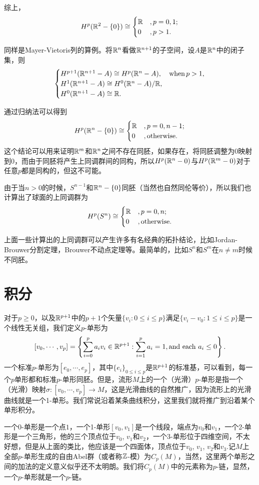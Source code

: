 综上，\[H^{p}(\mathbb{R}^2-\{0\})\cong
\begin{cases}
\mathbb{R}&,p=0,1;\\
0&,p>1.
\end{cases}\]

\para  同样是Mayer-Vietoris列的算例。将$\mathbb{R}^n$看做$\mathbb{R}^{n+1}$的子空间，设$A$是$\mathbb{R}^n$中的闭子集，则
\[
\begin{cases}
H^{p+1}(\mathbb{R}^{n+1}-A)\cong H^p(\mathbb{R}^n-A),&\text{when}\,p>1,\\
H^{1}(\mathbb{R}^{n+1}-A)\cong H^0(\mathbb{R}^n-A)/\mathbb{R},&\\
H^{0}(\mathbb{R}^{n+1}-A)\cong \mathbb{R}.&
\end{cases}
\]

通过归纳法可以得到
\[H^{p}(\mathbb{R}^n-\{0\})\cong
\begin{cases}
\mathbb{R}&,p=0,n-1;\\
0&,\text{otherwise}.
\end{cases}\]
这个结论可以用来证明$\mathbb{R}^m$和$\mathbb{R}^n$之间不存在同胚，如果存在，将同胚调整为$0$映射到$0$，而由于同胚将产生上同调群间的同构，所以$H^{p}(\mathbb{R}^n-{0})$与$H^{p}(\mathbb{R}^m-{0})$对于任意$p$都是同构的，但这不可能。

由于当$n>0$的时候，$S^{n-1}$和$\mathbb{R}^n-\{0\}$同胚（当然也自然同伦等价），所以我们也计算出了球面的上同调群为
\[H^{p}(S^{n})\cong
\begin{cases}
\mathbb{R}&,p=0,n;\\
0&,\text{otherwise}.
\end{cases}\]

上面一些计算出的上同调群可以产生许多有名经典的拓扑结论，比如Jordan-Brouwer分割定理，Brouwer不动点定理等。最简单的，比如$S^n$和$S^m$在$n\neq m$时候不同胚。

\section{积分}

\para 对于$p\geq 0$，以及$\mathbb{R}^{p+1}$中的$p+1$个矢量$\{v_i:0\leq i\leq p\}$满足$\{v_i-v_0:1\leq i\leq p\}$是一个线性无关组，我们定义$p$-单形为
\[
	[v_0,\cdots,v_p]=\left\{\sum_{i=0}^p a_iv_i\in \mathbb{R}^{p+1}:\sum_{i=1}^p a_i=1,\text{and each } a_i\leq 0\right\}.
\]
一个标准$p$-单形为$[e_0,\cdots,e_p]$，其中$\{e_i\}_{0\leq i \leq p}$是$\mathbb{R}^{p+1}$的标准基，可以看到，每一个$p$单形都和标准$p$-单形同胚。但是，流形$M$上的一个（光滑）$p$-单形是指一个（光滑）映射$\sigma:[v_0,\cdots,v_p]\to M$，这是光滑曲线的自然推广，因为流形上的光滑曲线就是一个1-单形。我们常说沿着某条曲线积分，这里我们就将推广到沿着某个单形积分。

一个0-单形是一个点$1$，一个1-单形$[v_0,v_1]$是一个线段，端点为$v_0$和$v_1$，一个2-单形是一个三角形，他的三个顶点位于$v_0$, $v_1$和$v_2$，一个3-单形位于四维空间，不太好想，但是从上面的类比，他应该是一个四面体，顶点位于$v_0$, $v_1$, $v_2$和$v_3$.记$M$上全部$p$-单形生成的自由Abel群（或者称$\mathbb{Z}$-模）为$C_p(M)$，当然，这里两个单形之间的加法的定义意义似乎还不太明朗。我们将$C_p(M)$中的元素称为$p$-链，显然，一个$p$-单形就是一个$p$-链。

